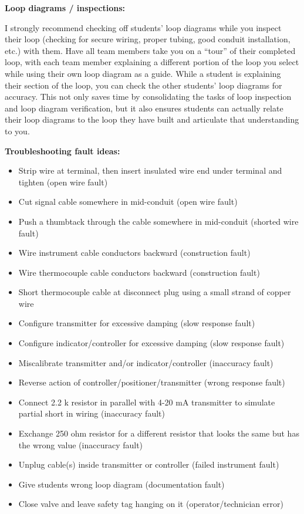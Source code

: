\begin{itemize}
\noindent
{\bf Loop diagrams / inspections:}

I strongly recommend checking off students' loop diagrams while you inspect their loop (checking for secure wiring, proper tubing, good conduit installation, etc.) with them.  Have all team members take you on a ``tour'' of their completed loop, with each team member explaining a different portion of the loop you select while using their own loop diagram as a guide.  While a student is explaining their section of the loop, you can check the other students' loop diagrams for accuracy.  This not only saves time by consolidating the tasks of loop inspection and loop diagram verification, but it also ensures students can actually relate their loop diagrams to the loop they have built and articulate that understanding to you.

\vskip 10pt

\goodbreak

\noindent
{\bf Troubleshooting fault ideas:}

\begin{itemize}
\item{} Strip wire at terminal, then insert insulated wire end under terminal and tighten (open wire fault)
\item{} Cut signal cable somewhere in mid-conduit (open wire fault)
\item{} Push a thumbtack through the cable somewhere in mid-conduit (shorted wire fault)
\item{} Wire instrument cable conductors backward (construction fault)
\item{} Wire thermocouple cable conductors backward (construction fault)
\item{} Short thermocouple cable at disconnect plug using a small strand of copper wire
\item{} Configure transmitter for excessive damping (slow response fault)
\item{} Configure indicator/controller for excessive damping (slow response fault)
\item{} Miscalibrate transmitter and/or indicator/controller (inaccuracy fault)
\item{} Reverse action of controller/positioner/transmitter (wrong response fault)
\item{} Connect 2.2 k resistor in parallel with 4-20 mA transmitter to simulate partial short in wiring (inaccuracy fault)
\item{} Exchange 250 ohm resistor for a different resistor that looks the same but has the wrong value (inaccuracy fault) 
\item{} Unplug cable(s) inside transmitter or controller (failed instrument fault)
\item{} Give students wrong loop diagram (documentation fault)
\item{} Close valve and leave safety tag hanging on it (operator/technician error)
\end{itemize}










\end{itemize}
